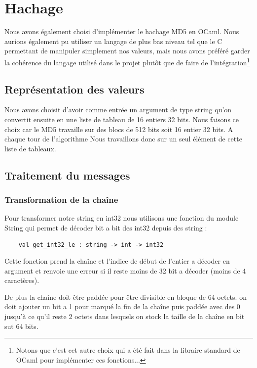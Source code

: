 \documentclass[12pt,a4paper]{article}
\begin{document}
 \section{Hachage}

    Nous avons également choisi d'implémenter le hachage MD5\cite{md5} en OCaml. Nous aurions également pu utiliser un langage de plus bas niveau tel que le C permettant de manipuler simplement nos valeurs, mais nous avons préféré garder la cohérence du langage utilisé dans le projet plutôt que de faire de l'intégration\footnote{Notons que c'est cet autre choix qui a été fait dans la libraire standard de OCaml pour implémenter ces fonctions...} 

    \subsection{Représentation des valeurs}

    Nous avons choisit d'avoir comme entrée un argument de type string qu'on convertit ensuite en une liste de tableau de 16 entiers 32 bits. 
    Nous faisons ce choix car le MD5 travaille sur des blocs de 512 bits soit 16 entier 32 bits. A chaque tour de l'algorithme Nous travaillons donc sur un seul élément de cette liste de tableaux.

    \subsection{Traitement du messages} 
    \subsubsection{Transformation de la chaîne }
    
    Pour transformer notre string en int32 nous utilisons une fonction du module String qui permet de décoder bit a bit des int32 depuis des string :
    
\bigskip 
\begin{lstlisting}
    val get_int32_le : string -> int -> int32
\end{lstlisting} \bigskip  

    Cette fonction prend la chaîne et l'indice de début de l'entier a décoder en argument et renvoie une erreur si il reste moins de 32 bit a décoder (moins de 4 caractères).

    De plus la chaîne doit être paddée pour être divisible en bloque de 64 octets. 
    on doit ajouter un bit a 1 pour marqué la fin de la chaîne puis paddée avec des 0 jusqu'à ce qu'il reste 2 octets dans lesquels on stock la taille de la chaîne en bit sut 64 bits. 
\end{document}
